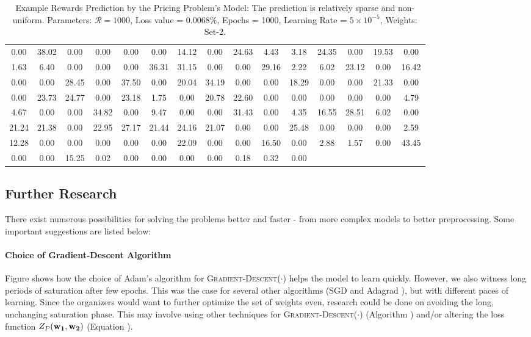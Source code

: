 \begin{table}[!htbp]
    \centering
    \caption[Example Rewards Prediction by the Pricing Problem's Model]{Example Rewards Prediction by the Pricing Problem's Model: The prediction is relatively sparse and non-uniform. Parameters: $\mathcal{R} = 1000$, Loss value = $0.0068\%$, Epochs = 1000, Learning Rate = $5 \times 10^{-5}$, Weights: Set-2.}
    \label{tab:Example Rewards Prediction by the Pricing Problem's Model}
    \setlength\tabcolsep{2pt}
    \begin{tabular}{|*{15}{c}|}
        \hline
        0.00 & 38.02 & 0.00 & 0.00 & 0.00 & 0.00 & 14.12 & 0.00 & 24.63 & 4.43 & 3.18 & 24.35 & 0.00 & 19.53 & 0.00\\
        1.63 & 6.40 & 0.00 & 0.00 & 0.00 & 36.31 & 31.15 & 0.00 & 0.00 & 29.16 & 2.22 & 6.02 & 23.12 & 0.00 & 16.42\\
        0.00 & 0.00 & 28.45 & 0.00 & 37.50 & 0.00 & 20.04 & 34.19 & 0.00 & 0.00 & 18.29 & 0.00 & 0.00 & 21.33 & 0.00\\
        0.00 & 23.73 & 24.77 & 0.00 & 23.18 & 1.75 & 0.00 & 20.78 & 22.60 & 0.00 & 0.00 & 0.00 & 0.00 & 0.00 & 4.79\\
        4.67 & 0.00 & 0.00 & 34.82 & 0.00 & 9.47 & 0.00 & 0.00 & 31.43 & 0.00 & 4.35 & 16.55 & 28.51 & 6.02 & 0.00\\
        21.24 & 21.38 & 0.00 & 22.95 & 27.17 & 21.44 & 24.16 & 21.07 & 0.00 & 0.00 & 25.48 & 0.00 & 0.00 & 0.00 & 2.59\\
        12.28 & 0.00 & 0.00 & 0.00 & 0.00 & 0.00 & 22.09 & 0.00 & 0.00 & 16.50 & 0.00 & 2.88 & 1.57 & 0.00 & 43.45\\
        0.00 & 0.00 & 15.25 & 0.02 & 0.00 & 0.00 & 0.00 & 0.00 & 0.18 & 0.32 & 0.00&&&&\\ \hline
    \end{tabular}
\end{table}

\subsection{Further Research}
There exist numerous possibilities for solving the problems better and faster - from more complex models to better preprocessing. Some important suggestions are listed below:

\paragraph{Choice of Gradient-Descent Algorithm} Figure  shows how the choice of Adam's algorithm \cite{Adam} for \textsc{Gradient-Descent}($\cdot$) helps the model to learn quickly. However, we also witness long periods of saturation after few epochs. This was the case for several other algorithms (SGD \cite{SGD} and Adagrad \cite{Adagrad}), but with different paces of learning. Since the organizers would want to further optimize the set of weights even, research could be done on avoiding the long, unchanging saturation phase. This may involve using other techniques for \textsc{Gradient-Descent}($\cdot$) (Algorithm ) and/or altering the loss function $Z_P(\mathbf{w_1}, \mathbf{w_2})$ (Equation ).


